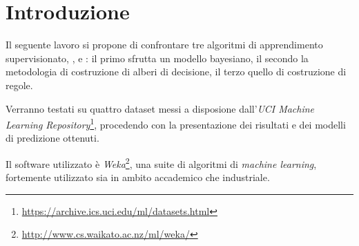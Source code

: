 \chapter{Introduzione}

Il seguente lavoro si propone di confrontare tre algoritmi di apprendimento supervisionato, \emph{}, \emph{} e \emph{}: il primo sfrutta un modello bayesiano, il secondo la metodologia di costruzione di alberi di decisione, il terzo quello di costruzione di regole.

Verranno testati su quattro dataset messi a disposione dall'\emph{UCI Machine Learning Repository}\footnote{\url{https://archive.ics.uci.edu/ml/datasets.html}}, procedendo con la presentazione dei risultati e dei modelli di predizione ottenuti.

Il software utilizzato è \emph{Weka}\footnote{\url{http://www.cs.waikato.ac.nz/ml/weka/}}, una suite di algoritmi di \textit{machine learning}, fortemente utilizzato sia in ambito accademico che industriale.